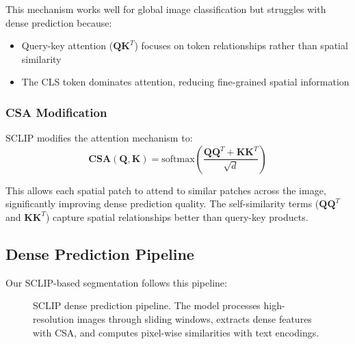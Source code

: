 This mechanism works well for global image classification but struggles with dense prediction because:
\begin{itemize}
    \item Query-key attention ($\mathbf{Q}\mathbf{K}^T$) focuses on token relationships rather than spatial similarity
    \item The CLS token dominates attention, reducing fine-grained spatial information
\end{itemize}

\subsubsection{CSA Modification}

SCLIP modifies the attention mechanism to:
\begin{equation}
\mathbf{CSA}(\mathbf{Q}, \mathbf{K}) = \text{softmax}\left(\frac{\mathbf{Q}\mathbf{Q}^T + \mathbf{K}\mathbf{K}^T}{\sqrt{d}}\right)
\end{equation}

This allows each spatial patch to attend to similar patches across the image, significantly improving dense prediction quality. The self-similarity terms ($\mathbf{Q}\mathbf{Q}^T$ and $\mathbf{K}\mathbf{K}^T$) capture spatial relationships better than query-key products.

\subsection{Dense Prediction Pipeline}

Our SCLIP-based segmentation follows this pipeline:

\begin{figure}[h]
\centering
{}
\caption{SCLIP dense prediction pipeline. The model processes high-resolution images through sliding windows, extracts dense features with CSA, and computes pixel-wise similarities with text encodings.}
\label{fig:sclip_pipeline}
\end{figure}

